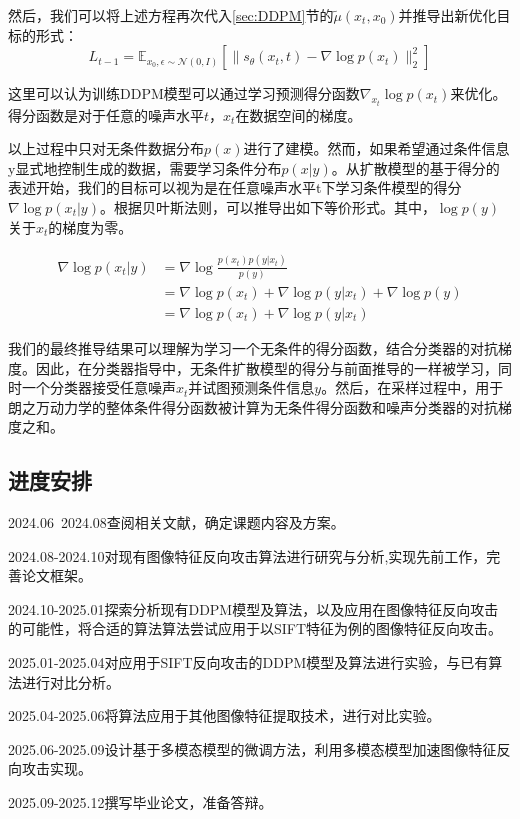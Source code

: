 然后，我们可以将上述方程再次代入\ref{sec:DDPM}节的$\widetilde{\mu}(x_t,x_0)$并推导出新优化目标的形式：
\begin{equation}\label{eqn-32}
      L_{t-1}=\mathbb{E}_{x_0,\epsilon \sim \mathcal{N}(0,I)}[\lVert s_\theta(x_t,t) - \nabla \log p(x_t)\rVert^2_2]
\end{equation}

这里可以认为训练DDPM模型可以通过学习预测得分函数$\nabla_{x_t}\log{p(x_t)}$来优化。得分函数是对于任意的噪声水平$t$，$x_t$在数据空间的梯度。
\par
以上过程中只对无条件数据分布$p ( x )$进行了建模。然而，如果希望通过条件信息y显式地控制生成的数据，需要学习条件分布$p ( x | y )$。从扩散模型的基于得分的表述开始，我们的目标可以视为是在任意噪声水平t下学习条件模型的得分$\nabla \log p ( x_t | y )$。根据贝叶斯法则，可以推导出如下等价形式。其中，$\log p ( y )$关于$x_t$的梯度为零。

\begin{align}
  \nabla \log p (x_t|y)
  &= \nabla \log \frac{
    p(x_t)p(y|x_t)
  }{
    p(y)
  } \nonumber\\
  &= \nabla \log p(x_t) + \nabla \log p(y|x_t) + \nabla \log p(y) \nonumber\\
  &= \nabla \log p(x_t) + \nabla \log p(y|x_t) \label{eqn-33}
\end{align}


我们的最终推导结果可以理解为学习一个无条件的得分函数，结合分类器的对抗梯度。因此，在分类器指导中，无条件扩散模型的得分与前面推导的一样被学习，同时一个分类器接受任意噪声$x_t$并试图预测条件信息$y$。然后，在采样过程中，用于朗之万动力学的整体条件得分函数被计算为无条件得分函数和噪声分类器的对抗梯度之和。

\subsection{进度安排}
      2024.06~2024.08\quad 查阅相关文献，确定课题内容及方案。
\par  2024.08-2024.10\quad 对现有图像特征反向攻击算法进行研究与分析,实现先前工作，完善论文框架。
\par  2024.10-2025.01\quad 探索分析现有DDPM模型及算法，以及应用在图像特征反向攻击的可能性，将合适的算法算法尝试应用于以SIFT特征为例的图像特征反向攻击。
\par  2025.01-2025.04\quad 对应用于SIFT反向攻击的DDPM模型及算法进行实验，与已有算法进行对比分析。
\par  2025.04-2025.06\quad 将算法应用于其他图像特征提取技术，进行对比实验。
\par  2025.06-2025.09\quad 设计基于多模态模型的微调方法，利用多模态模型加速图像特征反向攻击实现。
\par  2025.09-2025.12\quad 撰写毕业论文，准备答辩。
